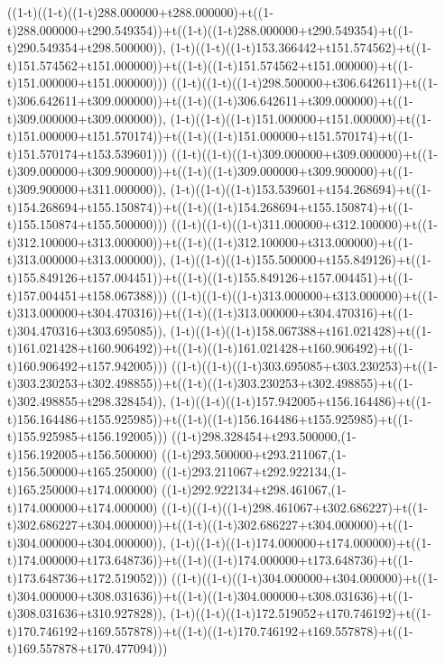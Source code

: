 ((1-t)((1-t)((1-t)288.000000+t288.000000)+t((1-t)288.000000+t290.549354))+t((1-t)((1-t)288.000000+t290.549354)+t((1-t)290.549354+t298.500000)),                                     (1-t)((1-t)((1-t)153.366442+t151.574562)+t((1-t)151.574562+t151.000000))+t((1-t)((1-t)151.574562+t151.000000)+t((1-t)151.000000+t151.000000)))
((1-t)((1-t)((1-t)298.500000+t306.642611)+t((1-t)306.642611+t309.000000))+t((1-t)((1-t)306.642611+t309.000000)+t((1-t)309.000000+t309.000000)),                                     (1-t)((1-t)((1-t)151.000000+t151.000000)+t((1-t)151.000000+t151.570174))+t((1-t)((1-t)151.000000+t151.570174)+t((1-t)151.570174+t153.539601)))
((1-t)((1-t)((1-t)309.000000+t309.000000)+t((1-t)309.000000+t309.900000))+t((1-t)((1-t)309.000000+t309.900000)+t((1-t)309.900000+t311.000000)),                                     (1-t)((1-t)((1-t)153.539601+t154.268694)+t((1-t)154.268694+t155.150874))+t((1-t)((1-t)154.268694+t155.150874)+t((1-t)155.150874+t155.500000)))
((1-t)((1-t)((1-t)311.000000+t312.100000)+t((1-t)312.100000+t313.000000))+t((1-t)((1-t)312.100000+t313.000000)+t((1-t)313.000000+t313.000000)),                                     (1-t)((1-t)((1-t)155.500000+t155.849126)+t((1-t)155.849126+t157.004451))+t((1-t)((1-t)155.849126+t157.004451)+t((1-t)157.004451+t158.067388)))
((1-t)((1-t)((1-t)313.000000+t313.000000)+t((1-t)313.000000+t304.470316))+t((1-t)((1-t)313.000000+t304.470316)+t((1-t)304.470316+t303.695085)),                                     (1-t)((1-t)((1-t)158.067388+t161.021428)+t((1-t)161.021428+t160.906492))+t((1-t)((1-t)161.021428+t160.906492)+t((1-t)160.906492+t157.942005)))
((1-t)((1-t)((1-t)303.695085+t303.230253)+t((1-t)303.230253+t302.498855))+t((1-t)((1-t)303.230253+t302.498855)+t((1-t)302.498855+t298.328454)),                                     (1-t)((1-t)((1-t)157.942005+t156.164486)+t((1-t)156.164486+t155.925985))+t((1-t)((1-t)156.164486+t155.925985)+t((1-t)155.925985+t156.192005)))
((1-t)298.328454+t293.500000,(1-t)156.192005+t156.500000)
((1-t)293.500000+t293.211067,(1-t)156.500000+t165.250000)
((1-t)293.211067+t292.922134,(1-t)165.250000+t174.000000)
((1-t)292.922134+t298.461067,(1-t)174.000000+t174.000000)
((1-t)((1-t)((1-t)298.461067+t302.686227)+t((1-t)302.686227+t304.000000))+t((1-t)((1-t)302.686227+t304.000000)+t((1-t)304.000000+t304.000000)),                                     (1-t)((1-t)((1-t)174.000000+t174.000000)+t((1-t)174.000000+t173.648736))+t((1-t)((1-t)174.000000+t173.648736)+t((1-t)173.648736+t172.519052)))
((1-t)((1-t)((1-t)304.000000+t304.000000)+t((1-t)304.000000+t308.031636))+t((1-t)((1-t)304.000000+t308.031636)+t((1-t)308.031636+t310.927828)),                                     (1-t)((1-t)((1-t)172.519052+t170.746192)+t((1-t)170.746192+t169.557878))+t((1-t)((1-t)170.746192+t169.557878)+t((1-t)169.557878+t170.477094)))
